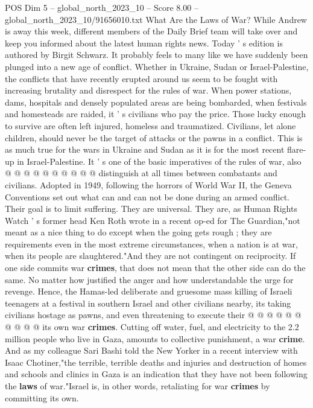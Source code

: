\begin{textsample}{POS Dim 5 – global\_north\_2023\_10 – Score 8.00 – global\_north\_2023\_10/91656010.txt}  \label{ex:f5_pos_437}
What Are the Laws of War?
While Andrew is away this week, different members of the Daily Brief team will take over and keep you informed about the latest human rights news.
Today ' s edition is authored by Birgit Schwarz.
It probably feels to many like we have suddenly been plunged into a new age of conflict.
Whether in Ukraine, Sudan or Israel-Palestine, the conflicts that have recently erupted around us seem to be fought with increasing brutality and disrespect for the rules of war.
When power stations, dams, hospitals and densely populated areas are being bombarded, when festivals and homesteads are raided, it ' s civilians who pay the price.
Those lucky enough to survive are often left injured, homeless and traumatized.
Civilians, let alone children, should never be the target of attacks or the pawns in a conflict.
This is as much true for the wars in Ukraine and Sudan as it is for the most recent flare-up in Israel-Palestine.
It ' s one of the basic imperatives of the rules of war, also @ @ @ @ @ @ @ @ @ @ distinguish at all times between combatants and civilians.
Adopted in 1949, following the horrors of World War II, the Geneva Conventions set out what can and can not be done during an armed conflict.
Their goal is to limit suffering.
They are universal.
They are, as Human Rights Watch ' s former head Ken Roth wrote in a recent op-ed for The Guardian,"not meant as a nice thing to do except when the going gets rough ; they are requirements even in the most extreme circumstances, when a nation is at war, when its people are slaughtered."And they are not contingent on reciprocity.
If one side commits war \textbf{crimes}, that does not mean that the other side can do the same.
No matter how justified the anger and how understandable the urge for revenge.
Hence, the Hamas-led deliberate and gruesome mass killing of Israeli teenagers at a festival in southern Israel and other civilians nearby, its taking civilians hostage as pawns, and even threatening to execute their @ @ @ @ @ @ @ @ @ @ its own war \textbf{crimes}.
Cutting off water, fuel, and electricity to the 2.2 million people who live in Gaza, amounts to collective punishment, a war \textbf{crime}.
And as my colleague Sari Bashi told the New Yorker in a recent interview with Isaac Chotiner,"the terrible, terrible deaths and injuries and destruction of homes and schools and clinics in Gaza is an indication that they have not been following the \textbf{laws} of war."Israel is, in other words, retaliating for war \textbf{crimes} by committing its own.

\end{textsample}
